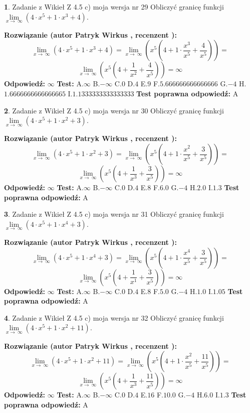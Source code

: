 \documentclass[12pt, a4paper]{article}
\theoremstyle{definition} %
\newtheorem{zad}{}
\newcommand{\zadStart}[1]{\begin{zad}#1\newline}
\newcommand{\zadStop}{\end{zad}}
\newcommand{\rozwStart}[2]{\noindent \textbf{Rozwiązanie (autor #1 , recenzent #2): }\newline}
\newcommand{\rozwStop}{\newline}
\newcommand{\odpStart}{\noindent \textbf{Odpowiedź:}\newline}
\newcommand{\odpStop}{\newline}
\newcommand{\testStart}{\noindent \textbf{Test:}\newline}
\newcommand{\testStop}{\newline}
\newcommand{\kluczStart}{\noindent \textbf{Test poprawna odpowiedź:}\newline}
\newcommand{\kluczStop}{\newline}
\begin{document}
\zadStart{Zadanie z Wikieł Z 4.5 c) moja wersja nr 29}
Obliczyć granicę funkcji  $\lim\limits_{x\to\ \infty}(4 \cdot x^{5}+1 \cdot x^{3}+4)$.
\zadStop
\rozwStart{Patryk Wirkus}{}
$$\lim\limits_{x\to\ \infty}(4 \cdot x^{5}+1 \cdot x^{3}+4) = \lim\limits_{x\to\ \infty}(x^{5}(4 +1 \cdot \frac{x^{3}}{x^{5}}+\frac{4}{x^{5}})) =$$ $$\lim\limits_{x\to\ \infty}(x^{5}(4 +\frac{1}{x^{2}}+\frac{4}{x^{5}})) =\infty$$
\rozwStop
\odpStart
$\infty$
\odpStop
\testStart
A.$\infty$ B.$-\infty$ C.$0$ D.$4$ E.$9$
F.$5.666666666666666$ G.$-4$
H.$1.6666666666666665$
I.$1.1333333333333333$
\testStop
\kluczStart
A
\kluczStop



\zadStart{Zadanie z Wikieł Z 4.5 c) moja wersja nr 30}
Obliczyć granicę funkcji  $\lim\limits_{x\to\ \infty}(4 \cdot x^{5}+1 \cdot x^{2}+3)$.
\zadStop
\rozwStart{Patryk Wirkus}{}
$$\lim\limits_{x\to\ \infty}(4 \cdot x^{5}+1 \cdot x^{2}+3) = \lim\limits_{x\to\ \infty}(x^{5}(4 +1 \cdot \frac{x^{2}}{x^{5}}+\frac{3}{x^{5}})) =$$ $$\lim\limits_{x\to\ \infty}(x^{5}(4 +\frac{1}{x^{3}}+\frac{3}{x^{5}})) =\infty$$
\rozwStop
\odpStart
$\infty$
\odpStop
\testStart
A.$\infty$ B.$-\infty$ C.$0$ D.$4$ E.$8$
F.$6.0$ G.$-4$
H.$2.0$
I.$1.3$
\testStop
\kluczStart
A
\kluczStop



\zadStart{Zadanie z Wikieł Z 4.5 c) moja wersja nr 31}
Obliczyć granicę funkcji  $\lim\limits_{x\to\ \infty}(4 \cdot x^{5}+1 \cdot x^{4}+3)$.
\zadStop
\rozwStart{Patryk Wirkus}{}
$$\lim\limits_{x\to\ \infty}(4 \cdot x^{5}+1 \cdot x^{4}+3) = \lim\limits_{x\to\ \infty}(x^{5}(4 +1 \cdot \frac{x^{4}}{x^{5}}+\frac{3}{x^{5}})) =$$ $$\lim\limits_{x\to\ \infty}(x^{5}(4 +\frac{1}{x^{1}}+\frac{3}{x^{5}})) =\infty$$
\rozwStop
\odpStart
$\infty$
\odpStop
\testStart
A.$\infty$ B.$-\infty$ C.$0$ D.$4$ E.$8$
F.$5.0$ G.$-4$
H.$1.0$
I.$1.05$
\testStop
\kluczStart
A
\kluczStop



\zadStart{Zadanie z Wikieł Z 4.5 c) moja wersja nr 32}
Obliczyć granicę funkcji  $\lim\limits_{x\to\ \infty}(4 \cdot x^{5}+1 \cdot x^{2}+11)$.
\zadStop
\rozwStart{Patryk Wirkus}{}
$$\lim\limits_{x\to\ \infty}(4 \cdot x^{5}+1 \cdot x^{2}+11) = \lim\limits_{x\to\ \infty}(x^{5}(4 +1 \cdot \frac{x^{2}}{x^{5}}+\frac{11}{x^{5}})) =$$ $$\lim\limits_{x\to\ \infty}(x^{5}(4 +\frac{1}{x^{3}}+\frac{11}{x^{5}})) =\infty$$
\rozwStop
\odpStart
$\infty$
\odpStop
\testStart
A.$\infty$ B.$-\infty$ C.$0$ D.$4$ E.$16$
F.$10.0$ G.$-4$
H.$6.0$
I.$1.3$
\testStop
\kluczStart
A
\kluczStop
\end{document}
